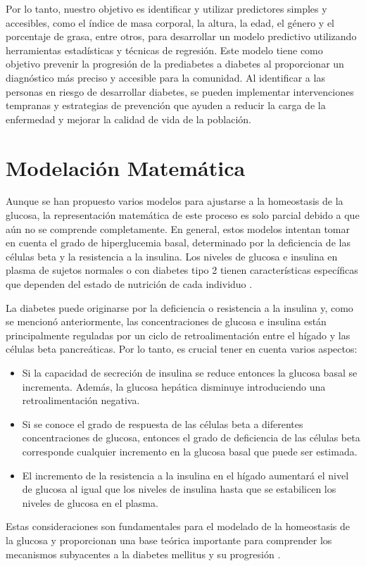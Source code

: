 Por lo tanto, nuestro objetivo es identificar y utilizar predictores simples y accesibles, como el índice de masa corporal, la altura, la edad, el género y el porcentaje de grasa, entre otros, para desarrollar un modelo predictivo utilizando herramientas estadísticas y técnicas de regresión. Este modelo tiene como objetivo prevenir la progresión de la prediabetes a diabetes al proporcionar un diagnóstico más preciso y accesible para la comunidad. Al identificar a las personas en riesgo de desarrollar diabetes, se pueden implementar intervenciones tempranas y estrategias de prevención que ayuden a reducir la carga de la enfermedad y mejorar la calidad de vida de la población.


\section{Modelación Matemática}

Aunque se han propuesto varios modelos para ajustarse a la homeostasis de la glucosa, la representación matemática de este proceso es solo parcial debido a que aún no se comprende completamente. En general, estos modelos intentan tomar en cuenta el grado de hiperglucemia basal, determinado por la deficiencia de las células beta y la resistencia a la insulina. Los niveles de glucosa e insulina en plasma de sujetos normales o con diabetes tipo 2 tienen características específicas que dependen del estado de nutrición de cada individuo \cite{ModelacionMatematica2020}.

La diabetes puede originarse por la deficiencia o resistencia a la insulina y, como se mencionó anteriormente, las concentraciones de glucosa e insulina están principalmente reguladas por un ciclo de retroalimentación entre el hígado y las células beta pancreáticas. Por lo tanto, es crucial tener en cuenta varios aspectos:

\begin{itemize}
    \item Si la capacidad de secreción de insulina se reduce entonces la glucosa basal se incrementa. Además, la glucosa hepática disminuye introduciendo una retroalimentación negativa. 

    \item Si se conoce el grado de respuesta de las células beta a diferentes concentraciones de glucosa, entonces el grado de deficiencia de las células beta corresponde cualquier incremento en la glucosa basal que puede ser estimada.

    \item El incremento de la resistencia a la insulina en el hígado aumentará el nivel de glucosa al igual que los niveles de insulina hasta que se estabilicen los niveles de glucosa en el plasma.
\end{itemize}

Estas consideraciones son fundamentales para el modelado de la homeostasis de la glucosa y proporcionan una base teórica importante para comprender los mecanismos subyacentes a la diabetes mellitus y su progresión \cite{InsulinDef}.
